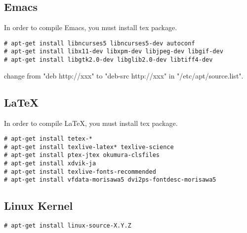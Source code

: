 \subsection{Emacs}

In order to compile Emacs, you must install tex package.

\noindent
\begin{Sbox}
\begin{minipage}[t]{0.975\linewidth}
\begin{verbatim}
# apt-get install libncurses5 libncurses5-dev autoconf
# apt-get install libx11-dev libxpm-dev libjpeg-dev libgif-dev
# apt-get install libgtk2.0-dev libglib2.0-dev libtiff4-dev
\end{verbatim}
\end{minipage}
\end{Sbox}
\fbox{\TheSbox}

change from "deb http://xxx" to "deb-src http://xxx" in "/etc/apt/source.list".


\subsection{LaTeX}

In order to compile LaTeX, you must install tex package.

\noindent
\begin{Sbox}
\begin{minipage}[t]{0.975\linewidth}
\begin{verbatim}
# apt-get install tetex-*
# apt-get install texlive-latex* texlive-science
# apt-get install ptex-jtex okumura-clsfiles
# apt-get install xdvik-ja
# apt-get install texlive-fonts-recommended
# apt-get install vfdata-morisawa5 dvi2ps-fontdesc-morisawa5
\end{verbatim}
\end{minipage}
\end{Sbox}
\fbox{\TheSbox}


\subsection{Linux Kernel}

\noindent
\begin{Sbox}
\begin{minipage}[t]{0.975\linewidth}
\begin{verbatim}
# apt-get install linux-source-X.Y.Z
\end{verbatim}
\end{minipage}
\end{Sbox}
\fbox{\TheSbox}

